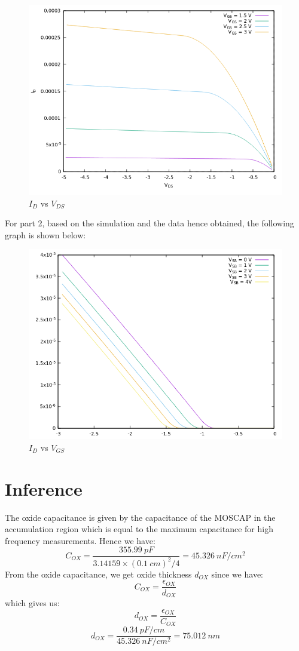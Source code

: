 \documentclass[12pt]{article}
\begin{document}
\begin{figure}[H]
	\centering
	\includegraphics[width = \linewidth, trim = {0 0 0 0}, clip]{Part1.png}
	\caption{\(I_D\) vs \(V_{DS}\)}
\end{figure}

For part 2, based on the simulation and the data hence obtained, the following graph is shown below:

\begin{figure}[H]
	\centering
	\includegraphics[width = \linewidth, trim = {0 0 0 0}, clip]{Part2.png}
	\caption{\(I_D\) vs \(V_{GS}\)}
\end{figure}

\section{Inference}
The oxide capacitance is given by the capacitance of the MOSCAP in the accumulation region which is equal to the maximum capacitance for high frequency measurements. Hence we have:
\[ C_{OX} =  \frac{355.99\ pF}{3.14159 \times (0.1\ cm)^2 / 4} = 45.326\ nF/cm^2 \]
From the oxide capacitance, we get oxide thickness \(d_{OX}\) since we have:
\[C_{OX} = \frac{\epsilon_{OX}}{d_{OX}}\]
which gives us:
\[d_{OX} = \frac{\epsilon_{OX}}{C_{OX}}\]
\[d_{OX} = \frac{0.34\ pF/cm}{45.326\ nF/cm^2} = 75.012\ nm\]
\end{document}
